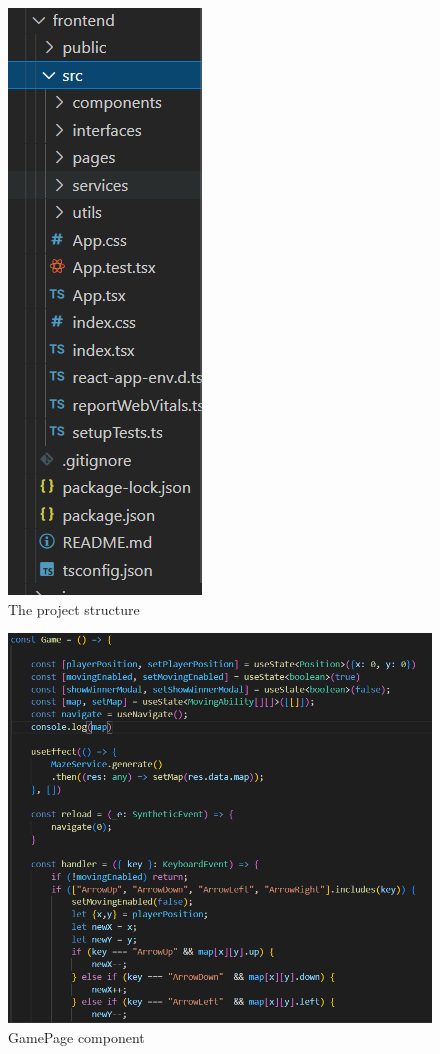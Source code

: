     \begin{figure}
      \includegraphics[width=0.4\linewidth]{structure.png}
      \caption{The project structure}
      \label{fig:structure}
    \end{figure}
    \begin{figure}
      \includegraphics[width=\linewidth]{game-page.png}
      \caption{GamePage component}
      \label{fig:game-page}
    \end{figure}